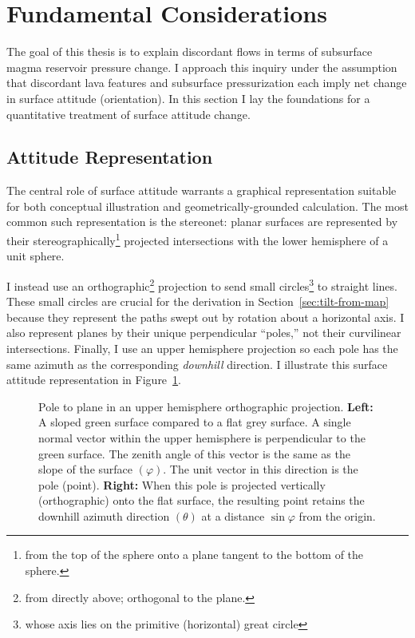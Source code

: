 \section{Fundamental Considerations}\label{sec:considerations}

The goal of this thesis is to explain discordant flows in terms of subsurface magma reservoir pressure change. I approach this inquiry under the assumption that discordant lava features and subsurface pressurization each imply net change in surface attitude (orientation). In this section I lay the foundations for a quantitative treatment of surface attitude change.

\subsection{Attitude Representation}\label{sec:attitude-representation}

The central role of surface attitude warrants a graphical representation suitable for both conceptual illustration and geometrically-grounded calculation. The most common such representation is the stereonet: planar surfaces are represented by their stereographically\footnote{from the top of the sphere onto a plane tangent to the bottom of the sphere.} projected intersections with the lower hemisphere of a unit sphere.

I instead use an orthographic\footnote{from directly above; orthogonal to the plane.} projection to send small circles\footnote{whose axis lies on the primitive (horizontal) great circle} to straight lines. These small circles are crucial for the derivation in Section~\ref{sec:tilt-from-map} because they represent the paths swept out by rotation about a horizontal axis. I also represent planes by their unique perpendicular ``poles,'' not their curvilinear intersections. Finally, I use an upper hemisphere projection so each pole has the same azimuth as the corresponding \emph{downhill} direction. I illustrate this surface attitude representation in Figure~\ref{fig:surface}.

\begin{figure}
    \caption[Orthographic pole to plane]{Pole to plane in an upper hemisphere orthographic projection. \textbf{Left:} A sloped green surface compared to a flat grey surface. A single normal vector within the upper hemisphere is perpendicular to the green surface. The zenith angle of this vector is the same as the slope of the surface $(\varphi)$. The unit vector in this direction is the pole (point). \textbf{Right:} When this pole is projected vertically (orthographic) onto the flat surface, the resulting point retains the downhill azimuth direction $(\theta)$ at a distance $\sin\varphi$ from the origin.}%
    \label{fig:surface}%
\end{figure}

